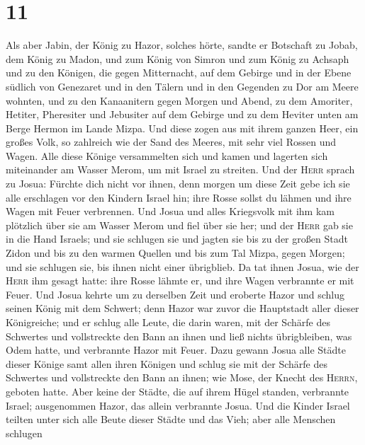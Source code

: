 \hypertarget{section-10}{%
\section{11}\label{section-10}}

 Als aber Jabin, der König zu Hazor, solches hörte, sandte
er Botschaft zu Jobab, dem König zu Madon, und zum König von Simron und
zum König zu Achsaph  und zu den Königen, die gegen
Mitternacht, auf dem Gebirge und in der Ebene südlich von Genezaret und
in den Tälern und in den Gegenden zu Dor am Meere wohnten,
 und zu den Kanaanitern gegen Morgen und Abend, zu dem
Amoriter, Hetiter, Pheresiter und Jebusiter auf dem Gebirge und zu dem
Heviter unten am Berge Hermon im Lande Mizpa.  Und diese
zogen aus mit ihrem ganzen Heer, ein großes Volk, so zahlreich wie der
Sand des Meeres, mit sehr viel Rossen und Wagen.  Alle
diese Könige versammelten sich und kamen und lagerten sich miteinander
am Wasser Merom, um mit Israel zu streiten.  Und der
\textsc{Herr} sprach zu Josua: Fürchte dich nicht vor ihnen, denn morgen
um diese Zeit gebe ich sie alle erschlagen vor den Kindern Israel hin;
ihre Rosse sollst du lähmen und ihre Wagen mit Feuer verbrennen.
 Und Josua und alles Kriegsvolk mit ihm kam plötzlich über
sie am Wasser Merom und fiel über sie her;  und der
\textsc{Herr} gab sie in die Hand Israels; und sie schlugen sie und
jagten sie bis zu der großen Stadt Zidon und bis zu den warmen Quellen
und bis zum Tal Mizpa, gegen Morgen; und sie schlugen sie, bis ihnen
nicht einer übrigblieb.  Da tat ihnen Josua, wie der
\textsc{Herr} ihm gesagt hatte: ihre Rosse lähmte er, und ihre Wagen
verbrannte er mit Feuer.  Und Josua kehrte um zu
derselben Zeit und eroberte Hazor und schlug seinen König mit dem
Schwert; denn Hazor war zuvor die Hauptstadt aller dieser Königreiche;
 und er schlug alle Leute, die darin waren, mit der
Schärfe des Schwertes und vollstreckte den Bann an ihnen und ließ nichts
übrigbleiben, was Odem hatte, und verbrannte Hazor mit Feuer.
 Dazu gewann Josua alle Städte dieser Könige samt allen
ihren Königen und schlug sie mit der Schärfe des Schwertes und
vollstreckte den Bann an ihnen; wie Mose, der Knecht des \textsc{Herrn},
geboten hatte.  Aber keine der Städte, die auf ihrem
Hügel standen, verbrannte Israel; ausgenommen Hazor, das allein
verbrannte Josua.  Und die Kinder Israel teilten unter
sich alle Beute dieser Städte und das Vieh; aber alle Menschen schlugen
